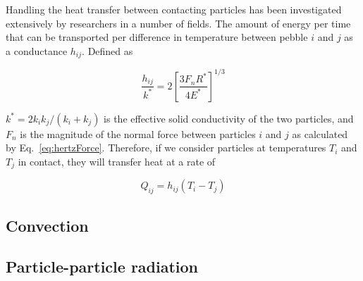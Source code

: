 Handling the heat transfer between contacting particles has been investigated extensively by researchers in a number of fields\cite{Zhou2009,Zhang2011,Wu2011,Vargas2001,Li2000,Chaudhuri2006}. The amount of energy per time that can be transported per difference in temperature between pebble $i$ and $j$ as a conductance $h_{ij}$. Defined as

\begin{equation}\label{eq:pebble-conductance}
	\frac{h_{ij}}{k^*}= 2\left[\frac{3F_nR^*}{4E^*}\right]^{1/3}
\end{equation}

$k^*= 2k_ik_j/(k_i+k_j)$ is the effective solid conductivity of the two particles, and $F_n$ is the magnitude of the normal force between particles $i$ and $j$ as calculated by Eq.~\ref{eq:hertzForce}. Therefore, if we consider particles at temperatures $T_i$ and $T_j$ in contact, they will transfer heat at a rate of

\begin{equation}
	Q_{ij} = h_{ij}(T_i - T_j)
\end{equation} 











\subsection{Convection}











\subsection{Particle-particle radiation}